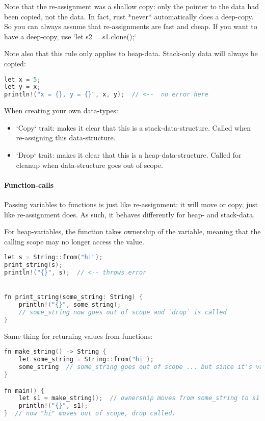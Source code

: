 Note that the re-assignment was a shallow copy: only the pointer to the data had been copied, not the data. In fact, rust *never* automatically does a deep-copy. So you can always assume that re-assignments are fast and cheap. If you want to have a deep-copy, use `let s2 = s1.clone();`

Note also that this rule only applies to heap-data. Stack-only data will always be copied:

\begin{lstlisting}[language=c]
let x = 5;
let y = x;
println!("x = {}, y = {}", x, y);  // <--  no error here
\end{lstlisting}

When creating your own data-types:
\begin{itemize}
    \item `Copy` trait: makes it clear that this is a stack-data-structure. Called when re-assigning this data-structure.
    \item `Drop` trait: makes it clear that this is a heap-data-structure. Called for cleanup when data-structure goes out of scope.
\end{itemize}

\paragraph{Function-calls}
Passing variables to functions is just like re-assignment: it will move or copy, just like re-assignment does. As such, it behaves differently for heap- and stack-data.

For heap-variables, the function takes ownership of the variable, meaning that the calling scope may no longer access the value.

\begin{lstlisting}[language=c]
let s = String::from("hi");
print_string(s);
println!("{}", s);  // <-- throws error


fn print_string(some_string: String) {
    println!("{}", some_string);
    // some_string now goes out of scope and `drop` is called
}
\end{lstlisting}

Same thing for returning values from functions:
\begin{lstlisting}[language=c]
fn make_string() -> String {
    let some_string = String::from("hi");
    some_string  // some_string goes out of scope ... but since it's value is being `move`d, the data is not freed.
}

fn main() {
    let s1 = make_string();  // ownership moves from some_string to s1
    println!("{}", s1);
}  // now "hi" moves out of scope, drop called.
\end{lstlisting}

